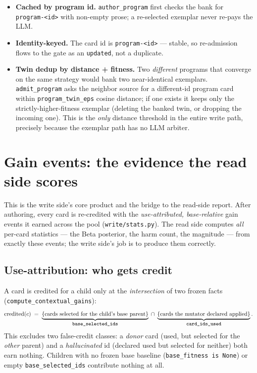 \documentclass[11pt]{article}
\newcommand{\code}[1]{\texttt{\small #1}}
\newcommand{\card}{c}
\begin{document}
\begin{itemize}[leftmargin=1.6em, itemsep=1pt]
  \item \textbf{Cached by program id.} \code{author\_program} first checks the
    bank for \code{program-<id>} with non-empty prose; a re-selected exemplar
    never re-pays the LLM.
  \item \textbf{Identity-keyed.} The card id is \code{program-<id>} --- stable, so
    re-admission flows to the gate as an \code{updated}, not a duplicate.
  \item \textbf{Twin dedup by distance + fitness.} Two \emph{different} programs
    that converge on the same strategy would bank two near-identical exemplars.
    \code{admit\_program} asks the neighbor source for a different-id program card
    within \code{program\_twin\_eps} cosine distance; if one exists it keeps only
    the strictly-higher-fitness exemplar (deleting the banked twin, or dropping
    the incoming one). This is the \emph{only} distance threshold in the entire
    write path, precisely because the exemplar path has no LLM arbiter.
\end{itemize}

\section{Gain events: the evidence the read side scores}
\label{sec:gain}

This is the write side's core product and the bridge to the read-side report.
After authoring, every card is re-credited with the \emph{use-attributed,
base-relative} gain events it earned across the pool
(\code{write/stats.py}). The read side computes \emph{all} per-card statistics
--- the Beta posterior, the harm count, the magnitude --- from exactly these
events; the write side's job is to produce them correctly.

\subsection{Use-attribution: who gets credit}

A card is credited for a child only at the \emph{intersection} of two frozen
facts (\code{compute\_contextual\_gains}):
\[
\text{credited}(\card) \;=\; \underbrace{\{\text{cards selected for the child's base parent}\}}_{\code{base\_selected\_ids}}
\;\cap\; \underbrace{\{\text{cards the mutator declared applied}\}}_{\code{card\_ids\_used}}.
\]
This excludes two false-credit classes: a \emph{donor} card (used, but selected
for the \emph{other} parent) and a \emph{hallucinated} id (declared used but
selected for neither) both earn nothing. Children with no frozen base baseline
(\code{base\_fitness is None}) or empty \code{base\_selected\_ids} contribute
nothing at all.
\end{document}
